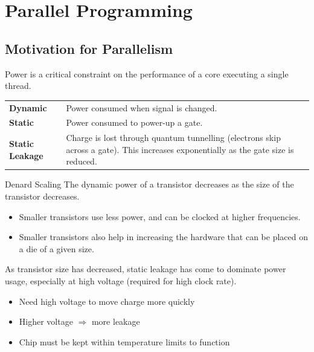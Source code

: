 \chapter{Parallel Programming}

\section{Motivation for Parallelism}
Power is a critical constraint on the performance of a core executing a single thread.
\begin{center}
	\begin{tabular}{l p{}}
		\textbf{Dynamic}        & Power consumed when signal is changed.                                                                                              \\
		\textbf{Static}         & Power consumed to power-up a gate.                                                                                                  \\
		\textbf{Static Leakage} & Charge is lost through quantum tunnelling (electrons skip across a gate). This increases exponentially as the gate size is reduced. \\
	\end{tabular}
\end{center}

\begin{definitionbox}{Denard Scaling}
	The dynamic power of a transistor decreases as the size of the transistor decreases.
	\begin{itemize}
		\item Smaller transistors use less power, and can be clocked at higher frequencies.
		\item Smaller transistors also help in increasing the hardware that can be placed on a die of a given size.
	\end{itemize}
\end{definitionbox}

As transistor size has decreased, static leakage has come to dominate power usage, especially at high voltage (required for high clock rate).
\begin{itemize}
	\item Need high voltage to move charge more quickly
	\item Higher voltage $\Rightarrow$ more leakage
	\item Chip must be kept within temperature limits to function
\end{itemize}

